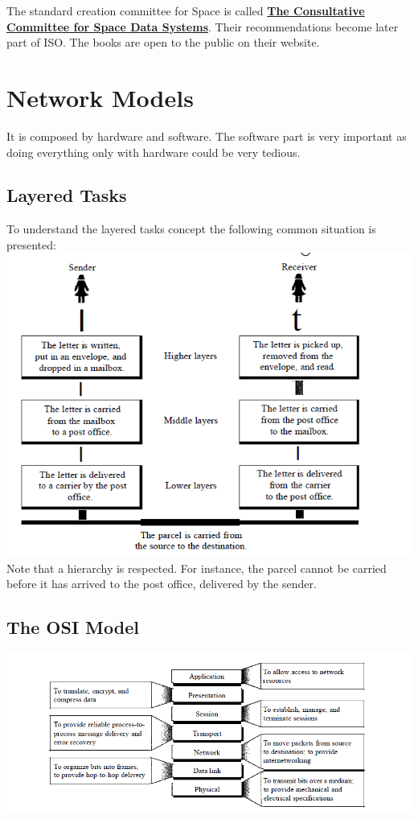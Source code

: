 \documentclass[12pt,a4paper]{report}
\begin{document}
The standard creation committee for Space is called \href{https://public.ccsds.org/default.aspx}{\textbf{The Consultative Committee for Space Data Systems}}.  Their recommendations become later part of ISO. The books are open to the public on their website.
\section{Network Models}
It is composed by hardware and software. The software part is very important as doing everything only with hardware could be very tedious.
\subsection{Layered Tasks}
To understand the layered tasks concept the following common situation is presented: \newline
\includegraphics[scale=1]{layers} \newline
Note that a hierarchy is respected. For instance, the parcel cannot be carried before it has arrived to the post office, delivered by the sender. 
\subsection{The OSI Model}
\includegraphics[scale=1]{osi} \newline
\end{document}
